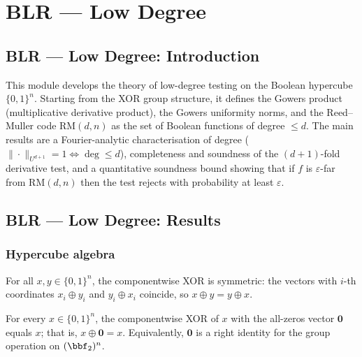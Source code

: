 \section{BLR --- Low Degree}
\subsection*{BLR --- Low Degree: Introduction}

This module develops the theory of low-degree testing on the Boolean hypercube
$\{0,1\}^n$.  Starting from the XOR group structure, it defines the Gowers product
(multiplicative derivative product), the Gowers uniformity norms, and the
Reed--Muller code $\mathrm{RM}(d,n)$ as the set of Boolean functions of degree
$\le d$.  The main results are a Fourier-analytic characterisation of degree
($\|\cdot\|_{U^{d+1}} = 1 \Leftrightarrow \deg \le d$), completeness and soundness
of the $(d{+}1)$-fold derivative test, and a quantitative soundness bound showing
that if $f$ is $\varepsilon$-far from $\mathrm{RM}(d,n)$ then the test rejects with
probability at least $\varepsilon$.

\subsection*{BLR --- Low Degree: Results}

\subsubsection{Hypercube algebra}

\begin{lemma}
\label{LowDegreeTest.xor_vec_comm}
\leanok
{}
For all $x, y \in \{0,1\}^n$, the componentwise XOR is symmetric: the vectors with
$i$-th coordinates $x_i \oplus y_i$ and $y_i \oplus x_i$ coincide, so $x \oplus y = y
\oplus x$.
\end{lemma}

\begin{lemma}
\label{LowDegreeTest.xor_vec_zero}
\leanok
{}
For every $x \in \{0,1\}^n$, the componentwise XOR of $x$ with the all-zeros vector
$\mathbf{0}$ equals $x$; that is, $x \oplus \mathbf{0} = x$. Equivalently, $\mathbf{0}$
is a right identity for the group operation on $(\bbf_2)^n$.
\end{lemma}

